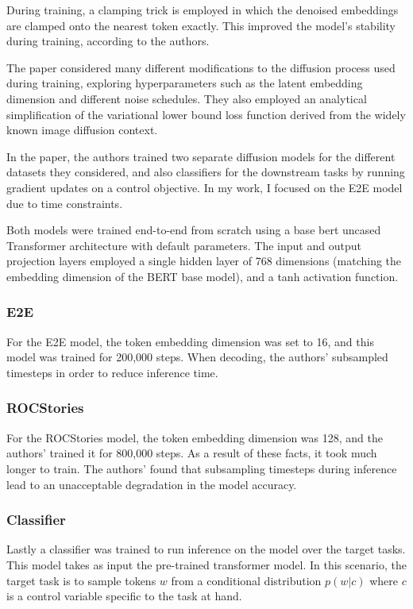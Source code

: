 During training, a clamping trick is employed in which the denoised embeddings are clamped onto the nearest token exactly. This improved the model's stability during training, according to the authors.

The paper considered many different modifications to the diffusion process used during training, exploring hyperparameters such as the latent embedding dimension and different noise schedules. They also employed an analytical simplification of the variational lower bound loss function derived from the widely known image diffusion context.

In the paper, the authors trained two separate diffusion models for the different datasets they considered, and also classifiers for the downstream tasks by running gradient updates on a control objective. In my work, I focused on the E2E model due to time constraints.

Both models were trained end-to-end from scratch using a base bert uncased Transformer\cite{vaswani2017attention} architecture with default parameters. The input and output projection layers employed a single hidden layer of 768 dimensions (matching the embedding dimension of the BERT base model), and a tanh activation function.

\subsubsection{E2E}

For the E2E model, the token embedding dimension was set to 16, and this model was trained for 200,000 steps. When decoding, the authors' subsampled timesteps in order to reduce inference time.

\subsubsection{ROCStories}

For the ROCStories model, the token embedding dimension was 128, and the authors' trained it for 800,000 steps. As a result of these facts, it took much longer to train. The authors' found that subsampling timesteps during inference lead to an unacceptable degradation in the model accuracy.

\subsubsection{Classifier}

Lastly a classifier was trained to run inference on the model over the target tasks. This model takes as input the pre-trained transformer model. In this scenario, the target task is to sample tokens $w$ from a conditional distribution $p(w|c)$ where $c$ is a control variable specific to the task at hand.

